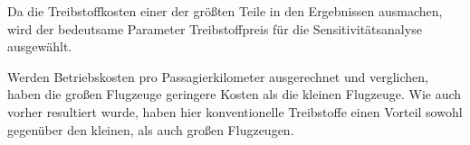 Da die Treibstoffkosten einer der größten Teile in den Ergebnissen ausmachen, 
wird der bedeutsame Parameter Treibstoffpreis für die Sensitivitätsanalyse ausgewählt.

Werden Betriebskosten pro Passagierkilometer ausgerechnet und verglichen, 
haben die großen Flugzeuge geringere Kosten als die kleinen Flugzeuge.
Wie auch vorher resultiert wurde, haben hier konventionelle Treibstoffe 
einen Vorteil sowohl gegenüber den kleinen, als auch großen Flugzeugen.
